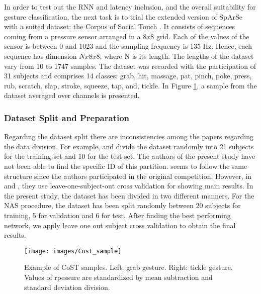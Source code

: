 \documentclass[10pt, a4paper, twocolumn]{article}
\begin{document}
In order to test out the RNN and latency inclusion, and the overall suitability for gesture classification, the next task is to trial the extended version of SpArSe with a suited dataset: the Corpus of Social Touch \cite{Jung2014}. It consists of sequences coming from a pressure sensor arranged in a $8x8$ grid. Each of the values of the sensor is between 0 and 1023 and the sampling frequency is 135 Hz. Hence, each sequence has dimension $Nx8x8$, where N is its length. The lengths of the dataset vary from 10 to 1747 samples. The dataset was recorded with the participation of 31 subjects and comprises 14 classes: grab, hit, massage, pat, pinch, poke, press, rub, scratch, slap, stroke, squeeze, tap, and, tickle. In Figure \ref{fig:costsample}, a sample from the dataset averaged over channels is presented.

\subsubsection{Dataset Split and Preparation}\label{SectionDataSplit}

Regarding the dataset split there are inconsistencies among the papers regarding the data division. For example, \cite{Hughes2017} and \cite{Jung2015} divide the dataset randomly into 21 subjects for the training set and 10 for the test set.  The authors of the present study have not been able to find the specific ID of this partition. \cite{Ta2015a} seems to follow the same structure since the authors participated in the original competition. However, in \cite{Albawi2018} and \cite{Jung2017}, they use leave-one-subject-out cross validation for showing main results. In the present study, the dataset has been divided in two different manners. For the NAS procedure, the dataset has been split randomly between 20 subjects for training, 5 for validation and 6 for test. After finding the best performing network, we apply leave one out subject cross validation to obtain the final results. 

\begin{figure}
	\centering
	\texttt{[image: images/Cost\_sample]}
	\caption{Example of CoST samples. Left: grab gesture. Right: tickle gesture. Values of rpessure are standardized by mean subtraction and standard deviation division.}
	\label{fig:costsample}
\end{figure}
\end{document}
